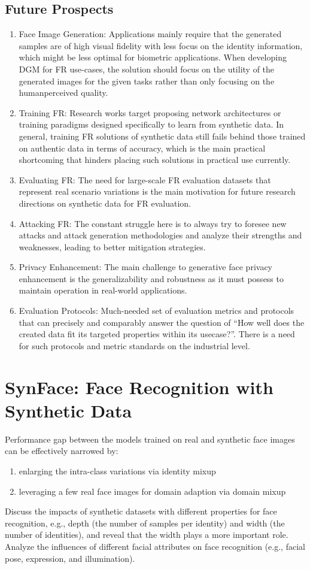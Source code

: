 \documentclass[12pt]{article}
\begin{document}
\subsection{Future Prospects}
\begin{enumerate}
  \item Face Image Generation: Applications mainly require that
  the generated samples are of high visual fidelity with
  less focus on the identity information, which might
  be less optimal for biometric applications. When developing DGM for FR use-cases, the solution should
  focus on the utility of the generated images for the
  given tasks rather than only focusing on the humanperceived quality.
  \item Training FR: Research works target proposing network architectures or
  training paradigms designed specifically to learn from
  synthetic data. In general, training FR solutions of
  synthetic data still fails behind those trained on authentic data in terms of accuracy, which is the main
  practical shortcoming that hinders placing such solutions in practical use currently.
  \item Evaluating FR: The need for large-scale FR evaluation datasets that
  represent real scenario variations is the main motivation for future research directions on synthetic data
  for FR evaluation.
  \item Attacking FR: The constant struggle here is
  to always try to foresee new attacks and attack generation methodologies and analyze their strengths and
  weaknesses, leading to better mitigation strategies.
  \item Privacy Enhancement: The main challenge to generative face privacy enhancement is the generalizability and robustness as it
  must possess to maintain operation in real-world applications.
  \item Evaluation Protocols:  Much-needed set of evaluation
  metrics and protocols that can precisely and comparably answer the question of ``How well does the
  created data fit its targeted properties within its usecase?''. There is a need for
  such protocols and metric standards on the industrial level.
\end{enumerate}
\section{SynFace: Face Recognition with Synthetic Data}
Performance gap between the models
trained on real and synthetic face images can
be effectively narrowed by: 
\begin{enumerate}
  \item enlarging the intra-class variations via identity mixup
  \item leveraging a few real face images for domain adaption via domain mixup
\end{enumerate}
Discuss the impacts of synthetic datasets with different properties for face recognition, e.g., depth (the
number of samples per identity) and width (the number
of identities), and reveal that the width plays a more
important role. Analyze the influences of different facial attributes
on face recognition (e.g., facial pose, expression, and illumination).
\end{document}
